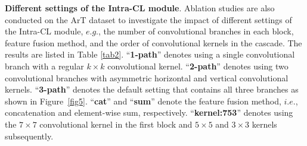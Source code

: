 \textbf{Different settings of the Intra-CL module}. Ablation studies are also conducted on the ArT dataset to investigate the impact of different settings of the Intra-CL module, $e.g.$, the number of convolutional branches in each block, feature fusion method, and the order of convolutional kernels in the cascade. The results are listed in Table \ref{tab2}. ``\textbf{1-path}'' denotes using a single convolutional branch with a regular $k \times k$ convolutional kernel. ``\textbf{2-path}'' denotes using two convolutional branches with asymmetric horizontal and vertical convolutional kernels. ``\textbf{3-path}'' denotes the default setting that contains all three branches as shown in Figure~\ref{fig5}. ``\textbf{cat}'' and ``\textbf{sum}'' denote the feature fusion method, $i.e.$, concatenation and element-wise sum, respectively. ``\textbf{kernel:753}'' denotes using the $7\times7$ convolutional kernel in the first block and $5\times5$ and $3\times3$ kernels subsequently. 



\begin{table}
\begin{center}
  \caption{Ablation study of different settings of the Intra-CL module on the ArT dataset.}
   \vspace{-1mm}
  \label{tab3}
 \vspace{-2mm}
\end{center}
\end{table}

